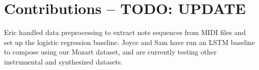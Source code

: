 \documentclass[twoside,twocolumn]{article}
\begin{document}
\section{Contributions -- TODO: UPDATE}

Eric handled data preprocessing to extract note sequences from MIDI files and set up the logistic regression baseline. Joyce and Sam have run an LSTM baseline to compose using our Mozart dataset, and are currently testing other instrumental and synthesized datasets.






\end{document}
